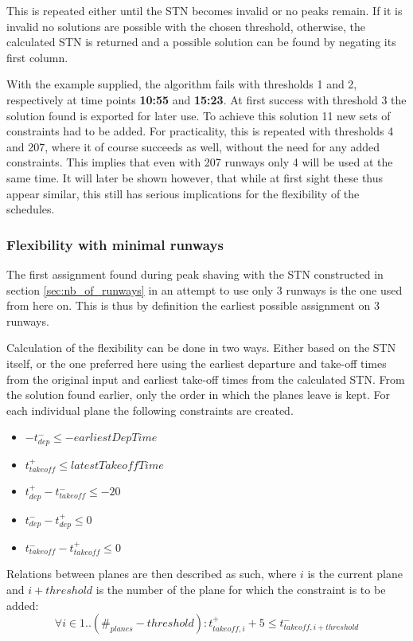 \documentclass[10pt,a4paper]{article}
\begin{document}
This is repeated either until the STN becomes invalid or no peaks remain. If it is invalid no solutions are possible with the chosen threshold, otherwise, the calculated STN is returned and a possible solution can be found by negating its first column.

With the example supplied, the algorithm fails with thresholds 1 and 2, respectively at time points \textbf{10:55} and  \textbf{15:23}. At first success with threshold 3 the solution found is exported for later use. To achieve this solution 11 new sets of constraints had to be added. For practicality, this is repeated with thresholds 4 and 207, where it of course succeeds as well, without the need for any added constraints. This implies that even with 207 runways only 4 will be used at the same time. It will later be shown however, that while at first sight these thus appear similar, this still has serious implications for the flexibility of the schedules.

\subsubsection{Flexibility with minimal runways}
The first assignment found during peak shaving with the STN constructed in section \ref{sec:nb_of_runways} in an attempt to use only 3 runways is the one used from here on. This is thus by definition the earliest possible assignment on 3 runways.

Calculation of the flexibility can be done in two ways. Either based on the STN itself, or the one preferred here using the earliest departure and take-off times from the original input and earliest take-off times from the calculated STN. From the solution found earlier, only the order in which the planes leave is kept. For each individual plane the following constraints are created.
\begin{itemize}
\item $-t_{dep}^- \leq -earliestDepTime$
\item $t_{takeoff}^+ \leq latestTakeoffTime$
\item $t_{dep}^+ -t_{takeoff}^- \leq -20$  
\item $t_{dep}^- - t_{dep}^+ \leq 0$
\item $t_{takeoff}^- - t_{takeoff}^+ \leq 0$
\end{itemize}
Relations between planes are then described as such, where $i$ is the current plane and $i+threshold$ is the number of the plane for which the constraint is to be added:
\begin{equation}
\forall i \in 1..(\#_{planes}-threshold) : t_{takeoff,i}^+ + 5 \leq t_{takeoff,i+threshold}^-
\end{equation}
\end{document}
